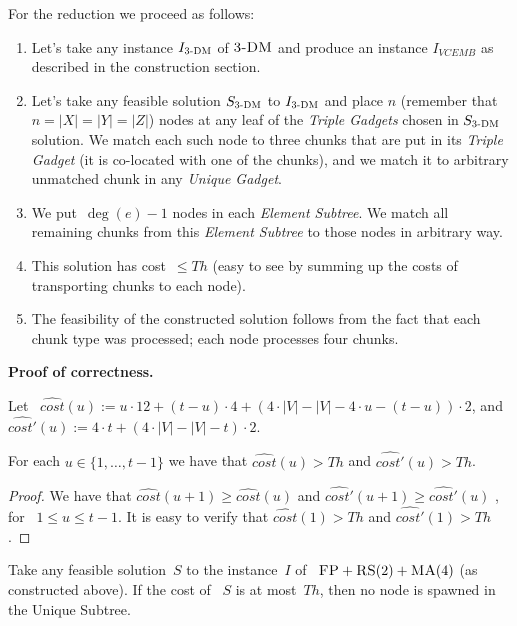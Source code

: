 \documentclass[preprint,12pt]{elsarticle}
\newcommand{\FP}{\textsc{FP}}
\newcommand{\RS}{\textsc{RS}}
\newcommand{\MA}{\textsc{MA}}
\newcommand{\Solution}{S}
\newcommand{\CostEstimOne}{\widehat{cost}}
\newcommand{\CostEstimTwo}{\widehat{cost'}}
\newcommand{\numNodes}{\ensuremath{|V|}}
\newcommand{\TripleGadget}{{\emph{Triple Gadget}}}
\newcommand{\TripleGadgets}{{\emph{Triple Gadgets}}}
\newcommand{\UnqGadget}{{\emph{Unique Gadget}}}
\newcommand{\TDM}{\textsc{3-DM}}
\newcommand{\Thr}{\ensuremath{Th}}
\begin{document}
For the reduction we proceed as follows:
\begin{enumerate}
  \item Let's take any instance $I_{\TDM}$ of $\TDM$ and produce an instance $I_{VCEMB}$ as described in the construction section.
  \item Let's take any feasible solution $S_{\TDM}$ to $I_{\TDM}$ and place $n$ (remember that~$n=|X|=|Y|=|Z|$) nodes at any leaf
  of the {\TripleGadgets} chosen in $S_{\TDM}$ solution. We
  match each such node to three chunks that are put in its
  {\TripleGadget} (it is co-located with one of the chunks), and we match it to
  arbitrary unmatched chunk in any \UnqGadget.
  \item We put~$\deg(e)-1$ nodes in each \emph{Element Subtree}. We match all
  remaining chunks from this \emph{Element Subtree} to those nodes in
  arbitrary way.
  \item This solution has cost~$\leq \Thr$ (easy to see by summing up the
  costs of transporting chunks to each node).
  \item The feasibility of the constructed solution follows from the
  fact that each chunk type was processed; each node processes four
  chunks.
\end{enumerate}

\textbf{Proof of correctness.}

  Let
 ~$\CostEstimOne(u) := u \cdot 12 + (t-u)\cdot 4 + (4\cdot \numNodes -
  \numNodes - 4\cdot u - (t-u))\cdot 2$, and 
$\CostEstimTwo(u) := 4\cdot t + (4\cdot
\numNodes - \numNodes - t)\cdot 2$.

\begin{lemma}
  For each $u \in \{ 1, \ldots, t-1 \}$ we have that $\CostEstimOne(u) > \Thr$ and
  $\CostEstimTwo(u) > \Thr$.
  \label{lem:cost-estims}
\end{lemma}

\begin{proof}
  We have that $\CostEstimOne(u+1) \geq \CostEstimOne(u)$ and $\CostEstimTwo(u+1) \geq \CostEstimTwo(u)$ , for
 ~$1\leq u \leq t-1$. It is easy to verify that $\CostEstimOne(1) > \Thr$ and $\CostEstimTwo(1) > \Thr$.
\end{proof}

\begin{lemma}
  Take any feasible solution~$\Solution$ to the instance~$I$ of
 ~$\FP+\RS(2)+\MA(4)$ (as constructed above). If the cost of
 ~$\Solution$ is at most~$\Thr$, then no node is spawned in the Unique
  Subtree.
  \label{th:no-unique}
\end{lemma}
\end{document}
